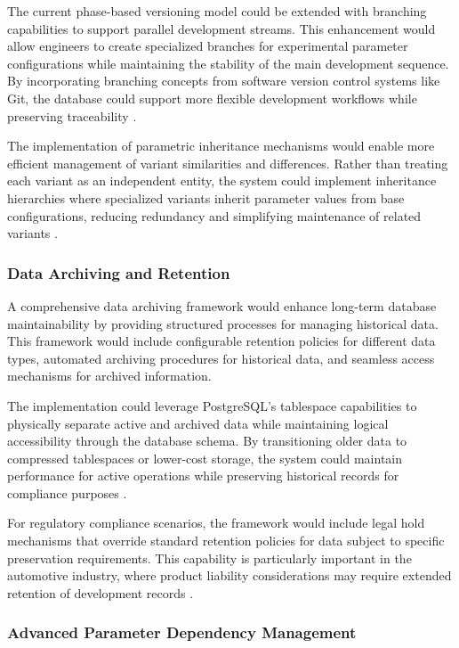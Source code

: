 The current phase-based versioning model could be extended with branching capabilities to support parallel development streams. This enhancement would allow engineers to create specialized branches for experimental parameter configurations while maintaining the stability of the main development sequence. By incorporating branching concepts from software version control systems like Git, the database could support more flexible development workflows while preserving traceability \cite{bhattacherjee2015principles}.

The implementation of parametric inheritance mechanisms would enable more efficient management of variant similarities and differences. Rather than treating each variant as an independent entity, the system could implement inheritance hierarchies where specialized variants inherit parameter values from base configurations, reducing redundancy and simplifying maintenance of related variants \cite{staron2021automotive}.

\subsubsection{Data Archiving and Retention}
\label{subsubsec:data-archiving}

A comprehensive data archiving framework would enhance long-term database maintainability by providing structured processes for managing historical data. This framework would include configurable retention policies for different data types, automated archiving procedures for historical data, and seamless access mechanisms for archived information.

The implementation could leverage PostgreSQL's tablespace capabilities to physically separate active and archived data while maintaining logical accessibility through the database schema. By transitioning older data to compressed tablespaces or lower-cost storage, the system could maintain performance for active operations while preserving historical records for compliance purposes \cite{obe2017postgresql}.

For regulatory compliance scenarios, the framework would include legal hold mechanisms that override standard retention policies for data subject to specific preservation requirements. This capability is particularly important in the automotive industry, where product liability considerations may require extended retention of development records \cite{staron2021automotive}.

\subsubsection{Advanced Parameter Dependency Management}
\label{subsubsec:dependency-management}


